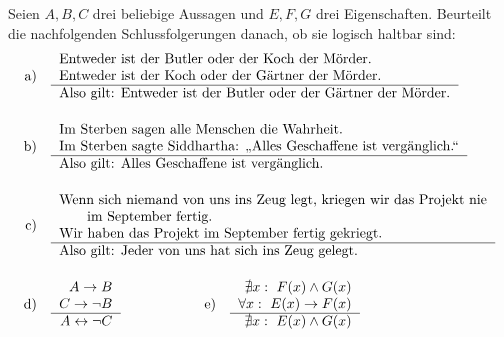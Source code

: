 \begin{aufg}
    Seien $A,B,C$ drei beliebige Aussagen und $E,F,G$ drei Eigenschaften. Beurteilt die nachfolgenden Schlussfolgerungen danach, ob sie logisch haltbar sind:
    \begin{align*}
        \text{a)}\quad &\begin{tabular}{l}
            Entweder ist der Butler oder der Koch der Mörder. \\
            Entweder ist der Koch oder der Gärtner der Mörder. \\ \hline
            Also gilt: Entweder ist der Butler oder der Gärtner der Mörder.
        \end{tabular} \\[1em]
        \text{b)}\quad &\begin{tabular}{l}
            Im Sterben sagen alle Menschen die Wahrheit. \\
            Im Sterben sagte Siddhartha: „Alles Geschaffene ist vergänglich.“ \\ \hline
            Also gilt: Alles Geschaffene ist vergänglich.
        \end{tabular} \\[1em]
        \text{c)}\quad &\begin{tabular}{l}
            Wenn sich niemand von uns ins Zeug legt, kriegen wir das Projekt nie \\
            \qquad im September fertig. \\
            Wir haben das Projekt im September fertig gekriegt. \\ \hline
            Also gilt: Jeder von uns hat sich ins Zeug gelegt.
        \end{tabular} \\[1em]
        \text{d)}\quad &\begin{tabular}{r}
            $A\to B$ \\
            $C\to \neg B$ \\ \hline
            $A\leftrightarrow \neg C$
        \end{tabular} \qquad\qquad\qquad \text{e)}\quad \begin{tabular}{r}
            $\nexists x:\ F(x)\land G(x)$ \\
            $\forall x:\ E(x)\to F(x)$ \\ \hline 
            $\nexists x:\ E(x)\land G(x)$
        \end{tabular}
    \end{align*}
\end{aufg}



